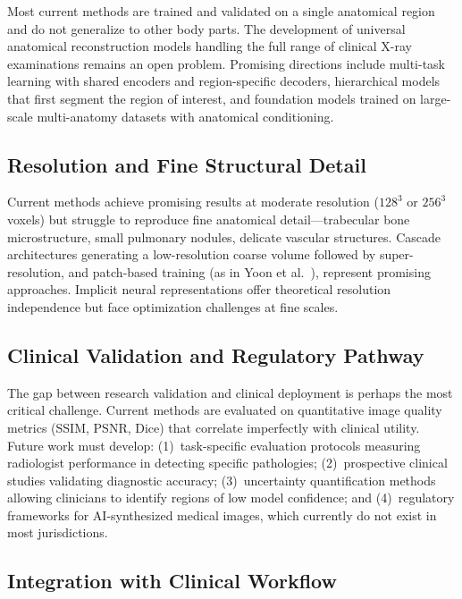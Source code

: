 \documentclass[10pt,twocolumn,a4paper]{article}
\begin{document}
Most current methods are trained and validated on a single anatomical region and
do not generalize to other body parts. The development of universal anatomical
reconstruction models handling the full range of clinical X-ray examinations
remains an open problem. Promising directions include multi-task learning with
shared encoders and region-specific decoders, hierarchical models that first
segment the region of interest, and foundation models trained on large-scale
multi-anatomy datasets with anatomical conditioning.

\subsection{Resolution and Fine Structural Detail}
\label{sec:challenges:resolution}

Current methods achieve promising results at moderate resolution ($128^3$ or
$256^3$ voxels) but struggle to reproduce fine anatomical detail---trabecular
bone microstructure, small pulmonary nodules, delicate vascular structures.
Cascade architectures generating a low-resolution coarse volume followed by
super-resolution, and patch-based training (as in Yoon et al.~\cite{yoon2024}),
represent promising approaches. Implicit neural representations offer theoretical
resolution independence but face optimization challenges at fine scales.

\subsection{Clinical Validation and Regulatory Pathway}
\label{sec:challenges:clinical}

The gap between research validation and clinical deployment is perhaps the most
critical challenge. Current methods are evaluated on quantitative image quality
metrics (SSIM, PSNR, Dice) that correlate imperfectly with clinical utility.
Future work must develop: (1)~task-specific evaluation protocols measuring
radiologist performance in detecting specific pathologies; (2)~prospective
clinical studies validating diagnostic accuracy; (3)~uncertainty quantification
methods allowing clinicians to identify regions of low model confidence; and
(4)~regulatory frameworks for AI-synthesized medical images, which currently do
not exist in most jurisdictions.

\subsection{Integration with Clinical Workflow}
\label{sec:challenges:workflow}
\end{document}
